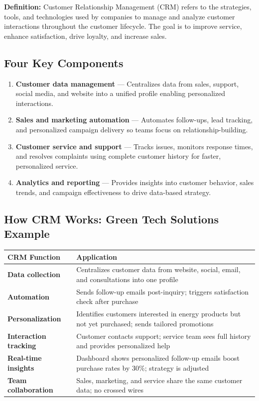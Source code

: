 \documentclass[11pt, letterpaper]{article}
\begin{document}
\begin{defbox}
\textbf{Definition:} Customer Relationship Management (CRM) refers to the strategies, tools, and technologies used by companies to manage and analyze customer interactions throughout the customer lifecycle. The goal is to improve service, enhance satisfaction, drive loyalty, and increase sales.
\end{defbox}

\subsection{Four Key Components}

\begin{enumerate}[leftmargin=*, label=\textbf{\arabic*.}]
  \item \textbf{Customer data management} --- Centralizes data from sales, support, social media, and website into a unified profile enabling personalized interactions.
  \item \textbf{Sales and marketing automation} --- Automates follow-ups, lead tracking, and personalized campaign delivery so teams focus on relationship-building.
  \item \textbf{Customer service and support} --- Tracks issues, monitors response times, and resolves complaints using complete customer history for faster, personalized service.
  \item \textbf{Analytics and reporting} --- Provides insights into customer behavior, sales trends, and campaign effectiveness to drive data-based strategy.
\end{enumerate}

\subsection{How CRM Works: Green Tech Solutions Example}

\begin{center}
\begin{tabular}{>{\bfseries}p{3.5cm} p{9cm}}
\toprule
CRM Function & Application \\
\midrule
Data collection & Centralizes customer data from website, social, email, and consultations into one profile \\
Automation & Sends follow-up emails post-inquiry; triggers satisfaction check after purchase \\
Personalization & Identifies customers interested in energy products but not yet purchased; sends tailored promotions \\
Interaction tracking & Customer contacts support; service team sees full history and provides personalized help \\
Real-time insights & Dashboard shows personalized follow-up emails boost purchase rates by 30\%; strategy is adjusted \\
Team collaboration & Sales, marketing, and service share the same customer data; no crossed wires \\
\bottomrule
\end{tabular}
\end{center}
\end{document}

